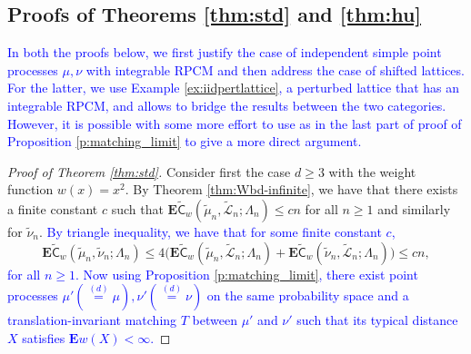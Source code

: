 \documentclass[12pt]{article}
\newcommand{\C}{ {\mathsf C}}
\newcommand{\tLeb}{\tilde{\mathcal{L}}}
\newcommand{\equlaw}{\stackrel{(d)}{=}}
\newcommand{\1}{\mathbf{1}}
\newcommand{\tmu}{\tilde{\mu}}
\newcommand{\E}{\mathbf  E}
\newcommand{\RL}[1]{\textcolor{blue}{#1}}
\newcommand{\dy}[1]{\textcolor{blue}{#1}}
\newcommand{\RL}[1]{#1}%
\newcommand{\dy}[1]{#1}%
\begin{document}
{{{{{%

%



\subsection{Proofs of Theorems \ref{thm:std} and \ref{thm:hu} }
\label{sec:proofs_thms12}

\dy{In both the proofs below, we first justify the case of independent simple point processes $\mu,\nu$ with integrable RPCM and then address the case of shifted lattices. For the latter, \RL{we use Example  \ref{ex:iidpertlattice}, a perturbed lattice that has an integrable RPCM, and allows to bridge the results between the two categories.} However, it is possible with some more effort to use \cite{erbar2023optimal} as in the last part of proof of Proposition \ref{p:matching_limit} to give a more direct argument.}


\begin{proof}[Proof of Theorem \ref{thm:std}]
Consider first the case $d \geq 3$ with the weight function $w(x) = x^2$. By Theorem \ref{thm:Wbd-infinite}, we have that there exists a finite constant $c$ such that $\E \widetilde {\C}_{w}(\tmu _{n}, \tLeb _{n};\Lambda_n) \leqslant cn$  for all $n \geqslant  1$ and similarly for $\tilde \nu_n$. \dy{By triangle inequality, we have that for some finite constant $c$,}
%
$$ \E \widetilde {\C}_{w}(\tmu _{n}, \tilde \nu_n ; \Lambda_n) \leq 4 \Big( \E \widetilde {\C}_{w}(\tmu _{n}, \tLeb _{n};\Lambda_n) + \E \widetilde {\C}_{w}(\tilde \nu_n, \tLeb _{n};\Lambda_n) \Big) \leq cn, $$
%
\dy{for all $n \geq 1$. Now using Proposition \ref{p:matching_limit}, there exist point processes $ \mu ' (\equlaw \mu), \nu ' ( \equlaw \nu)$ on \RL{the same probability space}  and a translation-invariant matching $T$ between $\mu'$ and $\nu'$ such that its  typical distance $X$ satisfies $ \mathbf E w(X) < \infty $.}    



\end{proof}}}}}}
\end{document}
